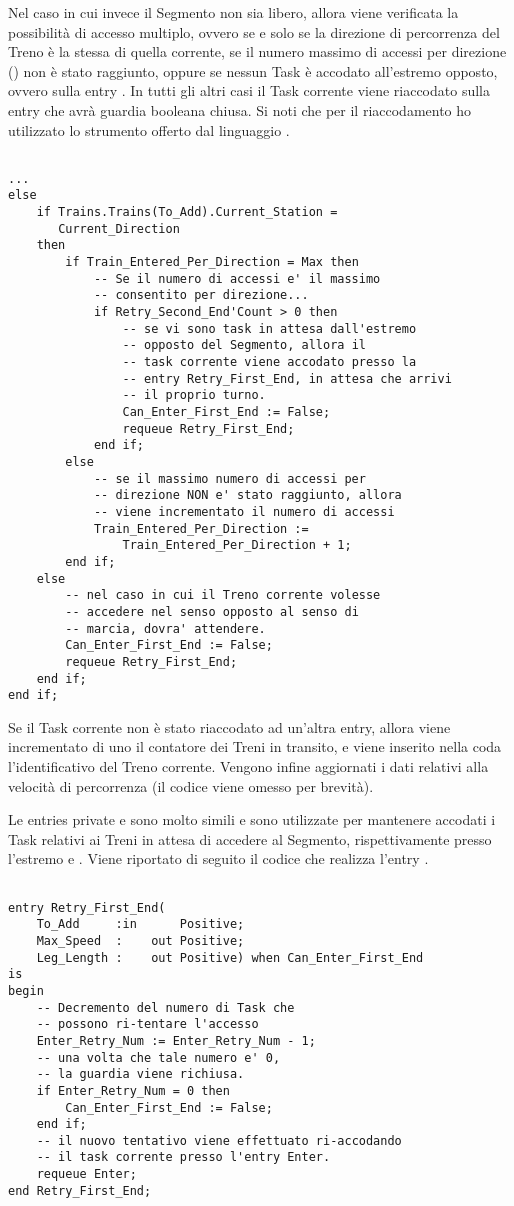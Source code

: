 Nel caso in cui invece il Segmento non sia libero, allora viene verificata la possibilità di accesso multiplo, ovvero se e solo se la direzione di percorrenza del Treno è la stessa di quella corrente, se il numero massimo di accessi per direzione () non è stato raggiunto, oppure se nessun Task è accodato all'estremo opposto, ovvero sulla entry . In tutti gli altri casi il Task corrente viene riaccodato sulla entry  che avrà guardia booleana chiusa. Si noti che per il riaccodamento ho utilizzato lo strumento  offerto dal linguaggio .

\begin{lstlisting}

...
else
	if Trains.Trains(To_Add).Current_Station = 
	   Current_Direction 
	then
		if Train_Entered_Per_Direction = Max then
			-- Se il numero di accessi e' il massimo 
			-- consentito per direzione...
			if Retry_Second_End'Count > 0 then
				-- se vi sono task in attesa dall'estremo
				-- opposto del Segmento, allora il
				-- task corrente viene accodato presso la 
				-- entry Retry_First_End, in attesa che arrivi
				-- il proprio turno.
				Can_Enter_First_End := False;
				requeue Retry_First_End;
			end if;
		else
			-- se il massimo numero di accessi per 
			-- direzione NON e' stato raggiunto, allora
			-- viene incrementato il numero di accessi
			Train_Entered_Per_Direction := 
				Train_Entered_Per_Direction + 1;
		end if;
	else
		-- nel caso in cui il Treno corrente volesse 
		-- accedere nel senso opposto al senso di 
		-- marcia, dovra' attendere.
		Can_Enter_First_End := False;
		requeue Retry_First_End;
	end if;
end if;
\end{lstlisting}

Se il Task corrente non è stato riaccodato ad un'altra entry, allora viene incrementato di uno il contatore dei Treni in transito, e viene inserito nella coda  l'identificativo del Treno corrente. Vengono infine aggiornati i dati relativi alla velocità di percorrenza (il codice viene omesso per brevità).

	Le entries private  e  sono molto simili e sono utilizzate per mantenere accodati i Task relativi ai Treni in attesa di accedere al Segmento, rispettivamente presso l'estremo  e . Viene riportato di seguito il codice che realizza l'entry .
	
	\begin{lstlisting}

entry Retry_First_End(
	To_Add     :in		Positive;
	Max_Speed  : 	out Positive;
	Leg_Length :	out	Positive) when Can_Enter_First_End
is
begin
	-- Decremento del numero di Task che 
	-- possono ri-tentare l'accesso
	Enter_Retry_Num := Enter_Retry_Num - 1;
	-- una volta che tale numero e' 0, 
	-- la guardia viene richiusa.
	if Enter_Retry_Num = 0 then
		Can_Enter_First_End := False;
	end if;
	-- il nuovo tentativo viene effettuato ri-accodando
	-- il task corrente presso l'entry Enter.
	requeue Enter;
end Retry_First_End;

	\end{lstlisting}
	
